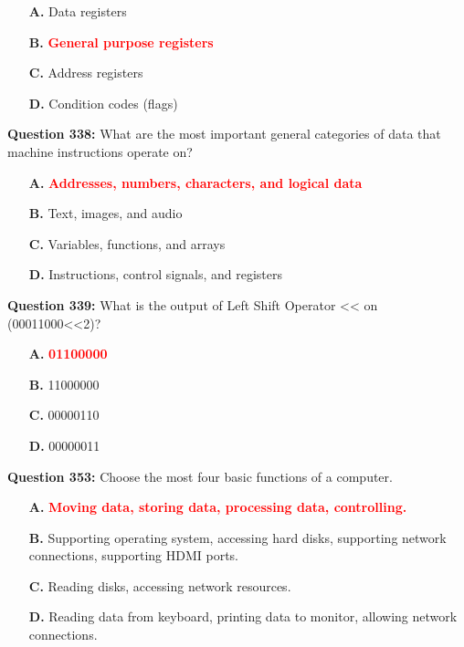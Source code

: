 \documentclass[12pt,a4paper]{article}
\begin{document}
\begin{itemize}
    \item[\textbf{A.}] Data registers
    \item[\textbf{B.}] \textcolor{red}{\textbf{General purpose registers}}
    \item[\textbf{C.}] Address registers
    \item[\textbf{D.}] Condition codes (flags)
\end{itemize}

\vspace{0.5cm}

\textbf{Question 338:} What are the most important general categories of data that machine instructions operate on?

\begin{itemize}
    \item[\textbf{A.}] \textcolor{red}{\textbf{Addresses, numbers, characters, and logical data}}
    \item[\textbf{B.}] Text, images, and audio
    \item[\textbf{C.}] Variables, functions, and arrays
    \item[\textbf{D.}] Instructions, control signals, and registers
\end{itemize}

\vspace{0.5cm}

\textbf{Question 339:} What is the output of Left Shift Operator << on (00011000<<2)?

\begin{itemize}
    \item[\textbf{A.}] \textcolor{red}{\textbf{01100000}}
    \item[\textbf{B.}] 11000000
    \item[\textbf{C.}] 00000110
    \item[\textbf{D.}] 00000011
\end{itemize}

\vspace{0.5cm}

\textbf{Question 353:} Choose the most four basic functions of a computer.

\begin{itemize}
    \item[\textbf{A.}] \textcolor{red}{\textbf{Moving data, storing data, processing data, controlling.}}
    \item[\textbf{B.}] Supporting operating system, accessing hard disks, supporting network connections, supporting HDMI ports.
    \item[\textbf{C.}] Reading disks, accessing network resources.
    \item[\textbf{D.}] Reading data from keyboard, printing data to monitor, allowing network connections.
\end{itemize}
\end{document}
